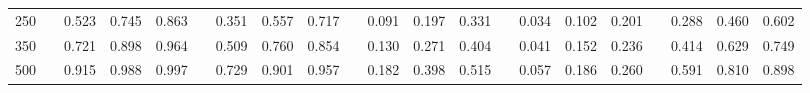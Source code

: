 % 
\begin{tabular}{ccccccccccccccccccccc}
  \hline
  \hline
250 &  & 0.523 & 0.745 & 0.863 &  & 0.351 & 0.557 & 0.717 &  & 0.091 & 0.197 & 0.331 &  & 0.034 & 0.102 & 0.201 &  & 0.288 & 0.460 & 0.602 \\ 
  350 &  & 0.721 & 0.898 & 0.964 &  & 0.509 & 0.760 & 0.854 &  & 0.130 & 0.271 & 0.404 &  & 0.041 & 0.152 & 0.236 &  & 0.414 & 0.629 & 0.749 \\ 
  500 &  & 0.915 & 0.988 & 0.997 &  & 0.729 & 0.901 & 0.957 &  & 0.182 & 0.398 & 0.515 &  & 0.057 & 0.186 & 0.260 &  & 0.591 & 0.810 & 0.898 \\ 
   \hline
\end{tabular}
